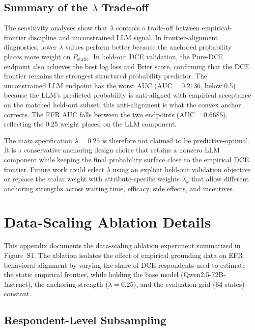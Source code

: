 \documentclass[11pt]{article}
\begin{document}
\subsection{Summary of the \texorpdfstring{\(\lambda\)}{lambda} Trade-off}

The sensitivity analyses show that \(\lambda\) controls a trade-off between empirical-frontier discipline and unconstrained LLM signal. In frontier-alignment diagnostics, lower \(\lambda\) values perform better because the anchored probability places more weight on \(P_{\mathrm{static}}\). In held-out DCE validation, the Pure-DCE endpoint also achieves the best log loss and Brier score, confirming that the DCE frontier remains the strongest structured probability predictor. The unconstrained LLM endpoint has the worst AUC ($\mathrm{AUC} = 0.2136$, below 0.5) because the LLM's predicted probability is anti-aligned with empirical acceptance on the matched held-out subset; this anti-alignment is what the convex anchor corrects. The EFR AUC falls between the two endpoints ($\mathrm{AUC} = 0.6685$), reflecting the $0.25$ weight placed on the LLM component.

The main specification \(\lambda=0.25\) is therefore not claimed to be predictive-optimal. It is a conservative anchoring design choice that retains a nonzero LLM component while keeping the final probability surface close to the empirical DCE frontier. Future work could select \(\lambda\) using an explicit held-out validation objective or replace the scalar weight with attribute-specific weights \(\lambda_k\) that allow different anchoring strengths across waiting time, efficacy, side effects, and incentives.


\section{Data-Scaling Ablation Details}\label{sec:data_scaling}
\label{app:data_scaling}

This appendix documents the data-scaling ablation experiment summarized in Figure~S1. The ablation isolates the effect of empirical grounding data on EFR behavioral alignment by varying the share of DCE respondents used to estimate the static empirical frontier, while holding the base model (Qwen2.5-72B-Instruct), the anchoring strength ($\lambda = 0.25$), and the evaluation grid (64 states) constant.

\subsection{Respondent-Level Subsampling}
\label{app:subsampling}
\end{document}

